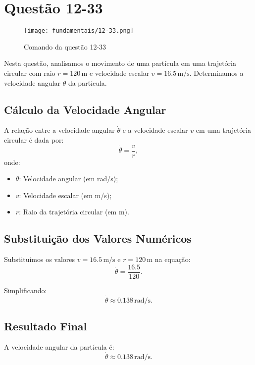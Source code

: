 \newpage
\section{Questão 12-33}

\begin{figure}[H]
	\centering
	\texttt{[image: fundamentais/12-33.png]}
	\caption{Comando da questão 12-33}\label{fig:12-33}
\end{figure}

Nesta questão, analisamos o movimento de uma partícula em uma trajetória circular com raio \(r = 120 \, \text{m}\) e velocidade escalar \(v = 16.5 \, \text{m/s}\). Determinamos a velocidade angular \(\dot{\theta}\) da partícula.

\subsection*{Cálculo da Velocidade Angular}
A relação entre a velocidade angular \(\dot{\theta}\) e a velocidade escalar \(v\) em uma trajetória circular é dada por:
\[
\dot{\theta} = \frac{v}{r},
\]
onde:
\begin{itemize}
    \item \(\dot{\theta}\): Velocidade angular (em rad/s);
    \item \(v\): Velocidade escalar (em m/s);
    \item \(r\): Raio da trajetória circular (em m).
\end{itemize}

\subsection*{Substituição dos Valores Numéricos}
Substituímos os valores \(v = 16.5 \, \text{m/s}\) e \(r = 120 \, \text{m}\) na equação:
\[
\dot{\theta} = \frac{16.5}{120}.
\]

Simplificando:
\[
\dot{\theta} \approx 0.138 \, \text{rad/s}.
\]

\subsection*{Resultado Final}
A velocidade angular da partícula é:
\[
\dot{\theta} \approx 0.138 \, \text{rad/s}.
\]
